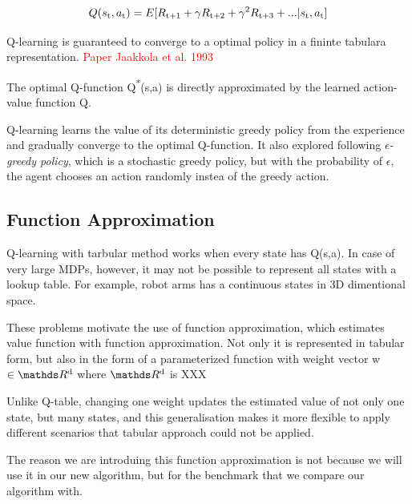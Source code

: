 \documentclass[12pt,twoside]{report}
\theoremstyle{plain}
\theoremstyle{definition}
\begin{document}
\begin{equation}
Q(s\textsubscript{t},a\textsubscript{t}) = E [R\textsubscript{t+1} + \gamma R\textsubscript{t+2} + \gamma^2 R\textsubscript{t+3} + ... \vert s\textsubscript{t},a\textsubscript{t} ]
\end{equation}


Q-learning is guaranteed to converge to a optimal policy in a fininte tabulara representation.
\textcolor{red}{Paper Jaakkola et al. 1993}

The optimal Q-function Q\textsuperscript{*}(s,a) is directly approximated by the learned action-value function Q.

Q-learning learns the value of its deterministic greedy policy from the experience and gradually converge to the optimal Q-function. It also explored following \textit{$\epsilon$-greedy policy}, which is a stochastic greedy policy, but with the probability of $\epsilon$, the agent chooses an action randomly instea of the greedy action.

\subsection{Function Approximation}
\label{function_approximation}
Q-learning with tarbular method works when every state has Q(s,a). In case of very large MDPs, however, 
it may not be possible to represent all states with a lookup table.
For example,  robot arms has a continuous states in 3D dimentional space. 

These problems motivate the use of function approximation, which estimates value function with function approximation.  Not only it is  represented in tabular form, but also in the form of a parameterized function with weight vector w $\in \R\textsuperscript{d}$ where $\R\textsuperscript{d}$ is XXX

Unlike Q-table, changing one weight updates the estimated value of not only one state, but many states, and this generalisation makes it more flexible to apply different scenarios that tabular approach could not be applied. 

The reason we are introduing this function approximation is not because we will use it in our new algorithm, but for the benchmark that we compare our algorithm with. 
\end{document}
